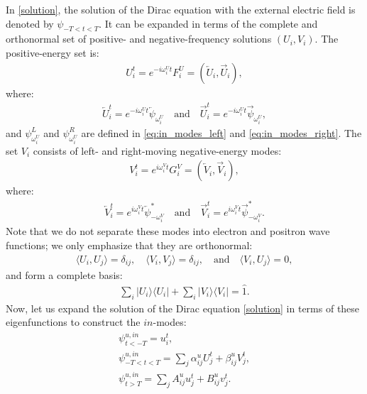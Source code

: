 \documentclass[12pt]{article}
\numberwithin{equation}{section}
\begin{document}
In \eqref{solution}, the solution of the Dirac equation with the external electric field is denoted by $\psi_{-T < t < T}$. It can be expanded in terms of the complete and orthonormal set of positive- and negative-frequency solutions $(U_i, V_i)$. The positive-energy set is:
\begin{align}
\label{not3}
    U^t_i = e^{-i \omega_i^U t} F^U_i = ( \overleftarrow{U}_i, \overrightarrow{U}_i),
\end{align}
where:
\begin{align}
    \overleftarrow{U}^t_i = e^{-i \omega^U_i t} \overleftarrow{\psi}_{\omega^U_i} \quad \text{and} \quad \overrightarrow{U}^t_i = e^{-i \omega^U_i t} \overrightarrow{\psi}_{\omega^U_i},
\end{align}
and $\psi_{\omega^U_i}^L$ and $\psi_{\omega^U_i}^R$ are defined in \eqref{eq:in_modes_left} and \eqref{eq:in_modes_right}. The set $V_i$ consists of left- and right-moving negative-energy modes:
\begin{align}
\label{not4}
    V^t_i = e^{i \omega_i^V t} G^V_i = ( \overleftarrow{V}_i, \overrightarrow{V}_i),
\end{align}
where:
\begin{align}
    \overleftarrow{V}^t_i = e^{i \omega^V_i t} \overleftarrow{\psi}^*_{-\omega^V_i} \quad \text{and} \quad \overrightarrow{V}^t_i = e^{i \omega^V_i t} \overrightarrow{\psi}^*_{-\omega^V_i}.
\end{align}
Note that we do not separate these modes into electron and positron wave functions; we only emphasize that they are orthonormal:
\begin{align}
    \langle U_i, U_j \rangle = \delta_{ij}, \quad 
    \langle V_i, V_j \rangle = \delta_{ij}, \quad \text{and} \quad 
    \langle V_i, U_j \rangle = 0,
\end{align}
and form a complete basis:
\begin{align}
\sum_i |U_i\rangle\langle U_i| + \sum_i |V_i\rangle\langle V_i| = \hat{1}.
\end{align}
Now, let us expand the solution of the Dirac equation \eqref{solution} in terms of these eigenfunctions to construct the $in$-modes:
\begin{gather}
    \psi^{u,in}_{t<-T} = u^t_i, \\ \nonumber
    \psi^{u,in}_{-T<t<T} = \sum_j \alpha^u_{ij} U^{t}_j + \beta^u_{ij} V^{t}_j, \\ \nonumber
    \psi^{u,in}_{t>T} = \sum_j A^u_{ij} u^{t}_j + B^u_{ij} v^{t}_j.
\end{gather}
\end{document}
